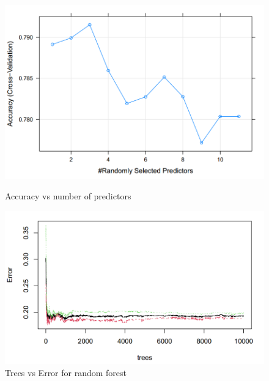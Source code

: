 \documentclass{article}
\begin{document}
\begin{figure}[H]
\begin{minipage}[]{.4\textwidth}
    \centering
    \includegraphics[scale=0.5]{RandomForest1.PNG}
        \caption{Accuracy vs number of predictors} 

   
    \label{fig:RF1}
\end{minipage}
\hspace{0.5cm}
\begin{minipage}[]{.6\textwidth}
    \centering
    \includegraphics[scale=0.45]{RandomForest2.PNG}
    \caption{Trees vs Error for random forest}
    \label{fig:RF2}
\end{minipage}
\end{figure}
\end{document}
